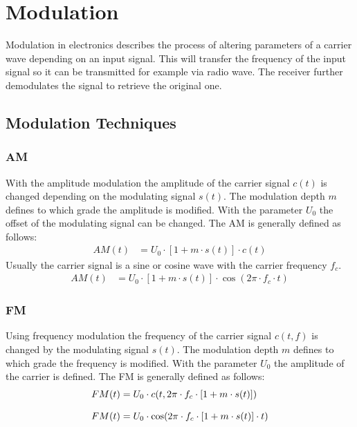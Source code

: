 \section{Modulation}\label{sec:theory:mod}

%
Modulation in electronics describes the process of altering parameters of a carrier wave depending on an input signal. This will transfer the frequency of the input signal so it can be transmitted for example via radio wave. The receiver further demodulates the signal to retrieve the original one.\cite{netzberger_kommunikationstechnologie_2021-1}

\subsection{Modulation Techniques}

\subsubsection*{AM}
With the amplitude modulation the amplitude of the carrier signal $c(t)$ is changed depending on the modulating signal $s(t)$. The modulation depth $m$ defines to which grade the amplitude is modified. With the parameter $U_0$ the offset of the modulating signal can be changed.\p
The AM is generally defined as follows:\cite{netzberger_kommunikationstechnologie_2021-1}
%
\begin{align}
  AM(t) &= U_0 \cdot [1 + m \cdot s(t)] \cdot c(t)
\end{align}
%
Usually the carrier signal is a sine or cosine wave with the carrier frequency $f_c$.
%
\begin{align}
  AM(t) &= U_0 \cdot [1 + m \cdot s(t)] \cdot \cos (2 \pi \cdot f_c \cdot t)\label{eq:theory:mod:am}
\end{align}
%
\subsubsection*{FM}
%
Using frequency modulation the frequency of the carrier signal $c(t, f)$ is changed by the modulating signal $s(t)$. The modulation depth $m$ defines to which grade the frequency is modified. With the parameter $U_0$ the amplitude of the carrier is defined.\p
The FM is generally defined as follows:\cite{netzberger_kommunikationstechnologie_2021-1}
%
\begin{align}
  FM(t) &= U_0 \cdot c(t, 2 \pi \cdot f_c \cdot [1 + m \cdot s(t)])\pmath
  FM(t) &= U_0 \cdot \cos (2 \pi \cdot f_c \cdot [1 + m \cdot s(t)] \cdot t) \label{eq:theory:mod:fm}
\end{align}

